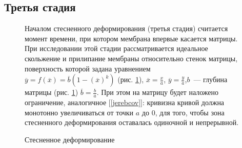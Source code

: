 	
		\newpage
	\subsection{Третья стадия}
	\begin{figure}[h!]
		\begin{minipage}[h]{0.48\linewidth}
			
			\def\svgwidth{\columnwidth}
			\caption{ Стесненное деформирование }
				\label{quad_matrix_pic}
		\end{minipage}
		\hfill
		\begin{minipage}[h]{0.48\linewidth}	
Началом стесненного деформирования (третья стадия) считается момент времени, при котором мембрана впервые касается матрицы. При исследовании этой стадии рассматривается идеальное скольжение и прилипание мембраны относительно стенок матрицы,  поверхность которой задана уравнением $\overline{y} = f(\overline{x}) = \overline{b}(1-(\overline{x})^k)$ (рис. \ref{quad_matrix_pic}), $\overline{x} = \frac x a$, $\overline{y} = \frac y a$,$b$~--- глубина матрицы (рис. \ref{quad_matrix_pic}) $\overline{b} = \frac b a$. При этом на матрицу будет наложено ограничение, аналогичное 
[\ref{jerebcov}]: кривизна кривой должна монотонно увеличиваться от точки $a$ до $0$, для того, чтобы зона стесненного деформирования оставалась одиночной и непрерывной.
	
		\end{minipage}

	\end{figure}
	
